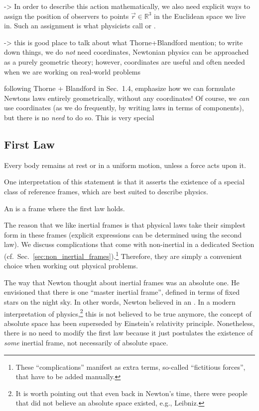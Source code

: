 \documentclass[../class_mech_main.tex]{subfiles}
\begin{document}
-> In order to describe this action mathematically, we also need explicit ways to assign the position of observers to points $\vec{r} \in \mathbb{R}^3$ in the Euclidean space we live in. Such an assignment is what physicists call  or .

-> this is good place to talk about what Thorne+Blandford mention; to write down things, we do \emph{not} need coordinates, Newtonian physics can be approached as a purely geometric theory; however, coordinates are useful and often needed when we are working on real-world problems


following Thorne + Blandford in Sec.~1.4, emphasize how we can formulate Newtons laws entirely geometrically, without any coordinates! Of course, we \emph{can} use coordinates (as we do frequently, by writing laws in terms of components), but there is no \emph{need} to do so. This is very special



		\subsection{First Law}
\begin{axiom}
	\centering
	Every body remains at rest or in a uniform motion, unless a force acts upon it.
\end{axiom}
One interpretation of this statement is that it asserts the existence of a special class of reference frames, which are best suited to describe physics.
\begin{defi}
	An  is a frame where the first law holds.
\end{defi}

The reason that we like inertial frames is that physical laws take their simplest form in these frames (explicit expressions can be determined using the second law). We discuss complications that come with non-inertial in a dedicated Section (cf.~Sec.~\ref{sec:non_inertial_frames}).\footnote{These \enquote{complications} manifest as extra terms, so-called \enquote{fictitious forces}, that have to be added manually.} Therefore, they are simply a convenient choice when working out physical problems.


The way that Newton thought about inertial frames was an absolute one. He envisioned that there is one \enquote{master inertial frame}, defined in terms of fixed stars on the night sky. In other words, Newton believed in an . In a modern interpretation of physics,\footnote{It is worth pointing out that even back in Newton's time, there were people that did not believe an absolute space existed, e.g., Leibniz.} this is not believed to be true anymore, the concept of absolute space has been superseded by Einstein's relativity principle. Nonetheless, there is no need to modify the first law because it just postulates the existence of \emph{some} inertial frame, not necessarily of absolute space. 
\end{document}
